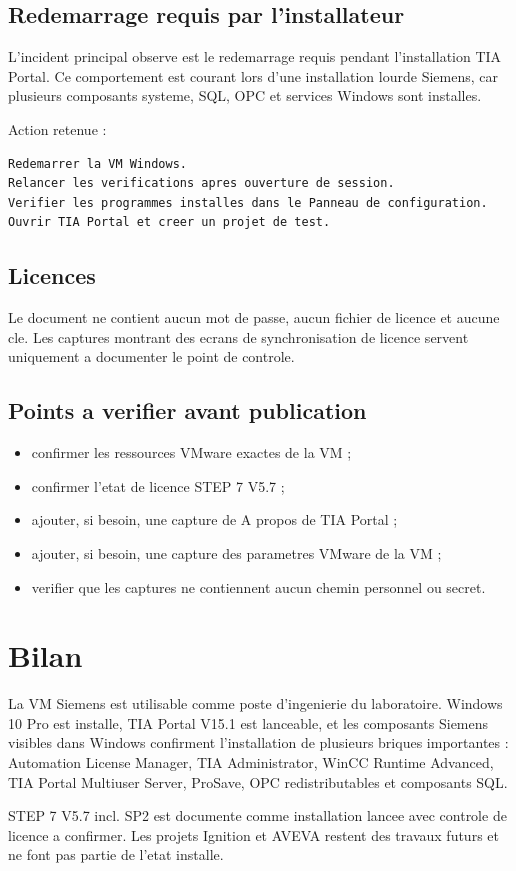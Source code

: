 \documentclass[11pt,a4paper]{article}
\begin{document}
\subsection{Redemarrage requis par l'installateur}

L'incident principal observe est le redemarrage requis pendant
l'installation TIA Portal. Ce comportement est courant lors d'une
installation lourde Siemens, car plusieurs composants systeme, SQL,
OPC et services Windows sont installes.

Action retenue :

\begin{lstlisting}
Redemarrer la VM Windows.
Relancer les verifications apres ouverture de session.
Verifier les programmes installes dans le Panneau de configuration.
Ouvrir TIA Portal et creer un projet de test.
\end{lstlisting}

\subsection{Licences}

Le document ne contient aucun mot de passe, aucun fichier de licence et
aucune cle. Les captures montrant des ecrans de synchronisation de
licence servent uniquement a documenter le point de controle.

\subsection{Points a verifier avant publication}

\begin{itemize}[leftmargin=*]
    \item confirmer les ressources VMware exactes de la VM ;
    \item confirmer l'etat de licence STEP 7 V5.7 ;
    \item ajouter, si besoin, une capture de \og A propos de TIA Portal \fg{} ;
    \item ajouter, si besoin, une capture des parametres VMware de la VM ;
    \item verifier que les captures ne contiennent aucun chemin personnel ou secret.
\end{itemize}

\section{Bilan}

La VM Siemens est utilisable comme poste d'ingenierie du laboratoire.
Windows 10 Pro est installe, TIA Portal V15.1 est lanceable, et les
composants Siemens visibles dans Windows confirment l'installation de
plusieurs briques importantes : Automation License Manager, TIA
Administrator, WinCC Runtime Advanced, TIA Portal Multiuser Server,
ProSave, OPC redistributables et composants SQL.

STEP 7 V5.7 incl. SP2 est documente comme installation lancee avec
controle de licence a confirmer. Les projets Ignition et AVEVA restent
des travaux futurs et ne font pas partie de l'etat installe.
\end{document}
